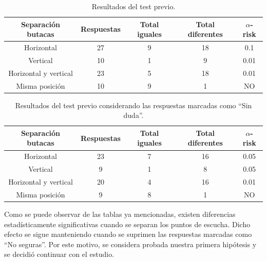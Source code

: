 \documentclass[11pt,a4paper,twoside]{book}
\begin{document}
            \begin{table}
			\begin{center}
			\begin{scriptsize}
			\begin{tabular}{| c | c | c | c || c |}
			    \hline
				\textbf{Separación butacas}&\textbf{Respuestas}&\textbf{Total iguales}&\textbf{Total diferentes}&\textbf{$\alpha$-risk}\\ \hline
                Horizontal&27&9&18&0.1\\ \hline
                Vertical&10&1&9&0.01\\ \hline
                Horizontal y vertical&23
                &5&18&0.01\\ \hline
                Misma posición&10&9&1&NO\\ \hline
			\end{tabular}
			\caption{Resultados del test previo.}
			\label{tablaResultadosDuda}
			\end{scriptsize}
			\end{center}	
		\end{table}	
		
		\begin{table}
			\begin{center}
			\begin{scriptsize}
			\begin{tabular}{| c | c | c | c || c |}
			    \hline
				\textbf{Separación butacas}&\textbf{Respuestas}&\textbf{Total iguales}&\textbf{Total diferentes}&\textbf{$\alpha$-risk}\\ \hline
                Horizontal&23&7&16&0.05\\ \hline
                Vertical&9&1&8&0.05\\ \hline
                Horizontal y vertical&20&4&16&0.01\\ \hline
                Misma posición&9&8&1&NO\\ \hline
			\end{tabular}
			\caption{Resultados del test previo considerando las respuestas marcadas como ``Sin duda''.}
			\label{tablaResultadosSinDuda}
			\end{scriptsize}
			\end{center}	
		\end{table}
		
		Como se puede observar de las tablas ya mencionadas, existen diferencias estadísticamente significativas cuando se separan los puntos de escucha. Dicho efecto se sigue manteniendo cuando se suprimen las respuestas marcadas como ``No seguras''. Por este motivo, se considera probada nuestra primera hipótesis y se decidió continuar con el estudio.
		
\end{document}
